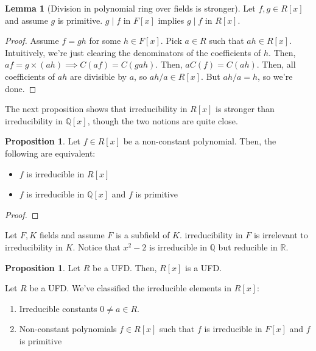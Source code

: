 \documentclass{article}
\theoremstyle{definition}
\newtheorem{lemma}[theorem]{Lemma}
\newtheorem{proposition}[theorem]{Proposition}
\newcommand{\R}{\mathbb{R}}
\newcommand{\Q}{\mathbb{Q}}
\begin{document}
\begin{lemma}[Division in polynomial ring over fields is stronger]
    Let $f,g \in R[x]$ and assume $g$ is primitive. $g \mid f$ in $F[x]$ implies $g \mid f$ in $R[x]$.
\end{lemma}
\begin{proof}
    Assume $f = gh$ for some $h \in F[x]$. Pick $a \in R$ such that $ah \in R[x]$. Intuitively, we're just clearing the denominators of the coefficients of $h$. Then, $af = g \times (ah) \implies C(af) = C(gah)$.
    Then, $aC(f) = C(ah)$. Then, all coefficients of $ah$ are divisible by $a$, so $ah/a \in R[x]$. But $ah/a = h$, so we're done.
\end{proof}

The next proposition shows that irreducibility in $R[x]$ is stronger than
irreducibility in $\Q[x]$, though the two notions are quite close.

\begin{proposition}
    Let $f \in R[x]$ be a non-constant polynomial. Then, the following are equivalent:

    \begin{itemize}
        \item $f$ is irreducible in $R[x]$
        \item $f$ is irreducible in $\Q[x]$ and $f$ is primitive
    \end{itemize}
\end{proposition}
\begin{proof}
    
\end{proof}

Let $F,K$ fields and assume $F$ is a subfield of $K$. irreducibility in $F$
is irrelevant to irreducibility in $K$. Notice that $x^{2} - 2$ is irreducible
in $\Q$ but reducible in $\R$.

\begin{proposition}
    Let $R$ be a UFD. Then, $R[x]$ is a UFD.
\end{proposition}

Let $R$ be a UFD. We've classified the irreducible elements in $R[x]$:

\begin{enumerate}
    \item Irreducible constants $0 \neq a \in R$.
    \item Non-constant polynomials $f \in R[x]$ such that $f$ is irreducible in $F[x]$ and $f$ is primitive
\end{enumerate}
\end{document}
